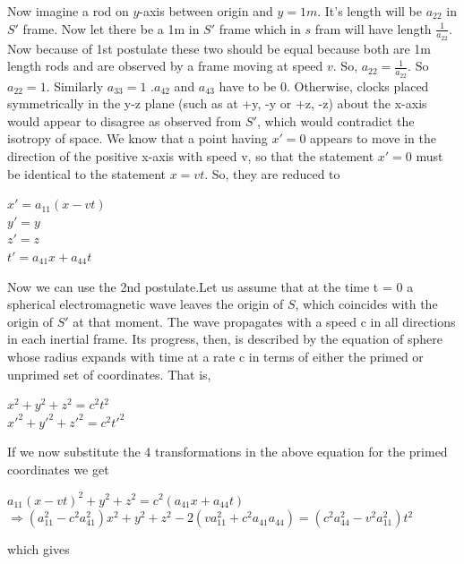 \documentclass[12pt,a4paper]{article}
\numberwithin{table}{section}
\numberwithin{figure}{section}
\numberwithin{equation}{section}
\theoremstyle{remark}
\theoremstyle{definition}
\begin{document}
Now imagine a rod on $y$-axis between origin and $y=1m$. It's length will be $a_{22}$ in $S'$ frame. Now let there be a 1m in $S'$ frame which in $s$ fram will have length $\frac{1}{a_{22}}$. Now because of 1st postulate these two should be equal because both are 1m length rods and are observed by a frame moving at speed $v$. So, $a_{22}=\frac{1}{a_{22}} $. So $a_{22}=1$. Similarly $a_{33}=1$ .$a_{42}$ and $a_{43}$ have to be $0$. Otherwise, clocks placed symmetrically in the y-z plane (such as at +y, -y or +z, -z) about the x-axis would appear to disagree as observed from $S'$, which would contradict 
the isotropy of space. We know that a point having $x'=0$ appears to move in the direction of the positive x-axis with speed v, so that the statement $x' = 0$ must be identical to the statement $x = vt$. So, they are reduced to

\begin{center}
$x' = a_{11}(x-vt)$\\
$y' = y$\\
$z' = z$\\
$t' = a_{41}x + a_{44}t$\\
\end{center}
Now we can use the 2nd postulate.Let us assume that at the time t = 0 a spherical electromagnetic wave leaves the origin of $S$, which coincides with the origin of $S'$ at that moment. The wave propagates with a speed c in all directions in each inertial frame. Its progress, then, is described by the equation of sphere whose radius expands with time at a rate c in terms of either the primed or unprimed set of coordinates. That is, 

\begin{center}
$x^2 + y^2 + z^2 = c^2t^2$\\
$x'^2 + y'^2 + z'^2 = c^2t'^2$\\
\end{center}
If we now substitute the 4 transformations in the above equation for the primed coordinates we get
\begin{center}
$a_{11}(x-vt)^2 + y^2 + z^2 = c^2(a_{41}x + a_{44}t)$\\
$\Rightarrow (a_{11}^2-c^2a_{41}^2)x^2 + y^2 + z^2 - 2(va_{11}^2+c^2a_{41}a_{44}) = (c^2a_{44}^2-v^2a_{11}^2)t^2$\\
\end{center}
which gives
\end{document}
